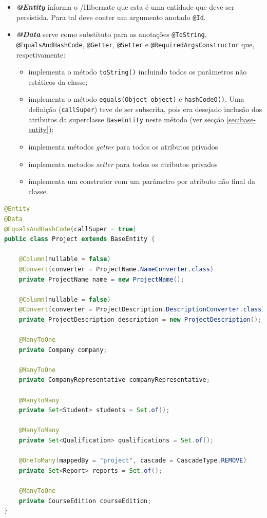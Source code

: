 \begin{itemize}
    \item \textbf{\textit{@Entity}} informa o /\gls{Hibernate} que esta é uma entidade que deve ser persistida. Para tal deve conter um argumento anotado \lstinline|@Id|.
    \item \textbf{\textit{@Data}}\cite{docs-annotation-data} serve como substituto para as anotações \lstinline|@ToString|, \lstinline|@EqualsAndHashCode|, \lstinline|@Getter|, \lstinline|@Setter| e \lstinline|@RequiredArgsConstructor| que, respetivamente: 
    
    \begin{itemize}
        \item implementa o método \lstinline|toString()| incluindo todos os parâmetros não estáticos da classe;
        \item implementa o método \lstinline|equals(Object object)| e \lstinline|hashCodeO()|. Uma definição (\lstinline|callSuper|) teve de ser subscrita, pois era desejado inclusão dos atributos da superclasse \lstinline|BaseEntity| neste método (ver secção \ref{sec:base-entity});
        \item implementa métodos \textit{getter} para todos os atributos privados
        \item implementa metodos \textit{setter} para todos os atributos privados
        \item implementa um construtor com um parâmetro por atributo não final da classe.
    \end{itemize}

\end{itemize}

\begin{lstlisting}[language=Java, caption={Classe \textit{Project}}, label={lst:class-project}]
@Entity
@Data
@EqualsAndHashCode(callSuper = true)
public class Project extends BaseEntity {

    @Column(nullable = false)
    @Convert(converter = ProjectName.NameConverter.class)
    private ProjectName name = new ProjectName();

    @Column(nullable = false)
    @Convert(converter = ProjectDescription.DescriptionConverter.class)
    private ProjectDescription description = new ProjectDescription();

    @ManyToOne
    private Company company;

    @ManyToOne
    private CompanyRepresentative companyRepresentative;

    @ManyToMany
    private Set<Student> students = Set.of();

    @ManyToMany
    private Set<Qualification> qualifications = Set.of();

    @OneToMany(mappedBy = "project", cascade = CascadeType.REMOVE)
    private Set<Report> reports = Set.of();

    @ManyToOne
    private CourseEdition courseEdition;
}
\end{lstlisting}













